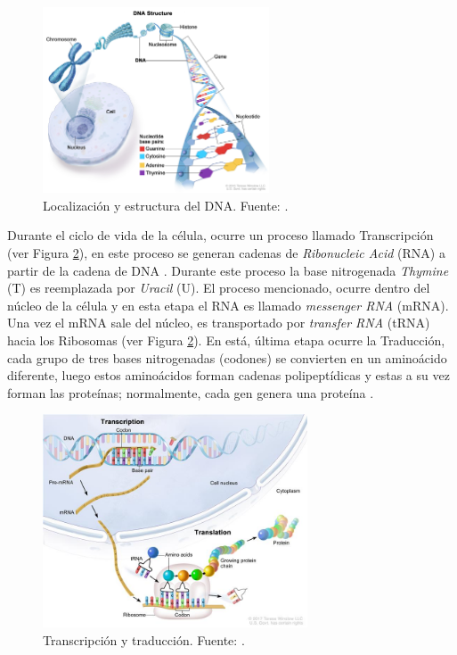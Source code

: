 \begin{figure}[H]
	\centering
	\includegraphics[width=0.6\textwidth]{img/neoantigen/dna}
	\caption{Localización y estructura del DNA. Fuente:  \cite{NCIdictionary2022}.}	
	\label{img:dnalocation}
\end{figure}

Durante el ciclo de vida de la célula, ocurre un proceso llamado Transcripción (ver Figura \ref{img:trans}), en este proceso se generan cadenas de \textit{Ribonucleic Acid} (RNA) a partir de la cadena de DNA \citep{NCIdictionary2022}.  Durante este proceso la base nitrogenada \textit{Thymine} (T) es reemplazada por \textit{Uracil} (U). El proceso mencionado, ocurre dentro del núcleo de la célula y en esta etapa el RNA es llamado \textit{messenger RNA} (mRNA). Una vez el mRNA sale del núcleo, es transportado por \textit{transfer RNA} (tRNA) hacia los Ribosomas (ver Figura \ref{img:trans}). En está, última etapa ocurre la Traducción, cada grupo de tres bases nitrogenadas (codones) se convierten en un aminoácido diferente, luego estos aminoácidos forman cadenas polipeptídicas y estas a su vez forman las proteínas; normalmente, cada gen genera una proteína \citep{xiong2006essential, NCIdictionary2022}.



\begin{figure}[H]
	\centering
	\includegraphics[width=0.7\textwidth]{img/neoantigen/trans}
	\caption{Transcripción y traducción. Fuente:  \cite{nci2020}.}	
	\label{img:trans}
\end{figure}

